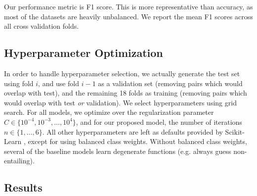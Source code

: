 
Our performance metric is F1 score. This is more representative than
accuracy, as most of the datasets are heavily unbalanced. We report the mean
F1 scores across all cross validation folds.

\subsection{Hyperparameter Optimization}

In order to handle hyperparameter selection, we actually generate the test set
using fold $i$, and use fold $i-1$ as a validation set (removing pairs which
would overlap with test), and the remaining 18 folds as training (removing
pairs which would overlap with test {\em or} validation). We select
hyperparameters using grid search. For all models, we optimize over the regularization parameter
$C \in \{10^{-4}, 10^{-3}, \ldots, 10^4\}$, and for our proposed model, the
number of iterations $n \in \{1, \ldots, 6\}$. All other hyperparameters
are left as defaults provided by Scikit-Learn \cite{pedregosa:2013:jmlr},
except for using balanced class weights. Without balanced class weights,
several of the baseline models learn degenerate functions (e.g. always guess
non-entailing).

\subsection{Results}

